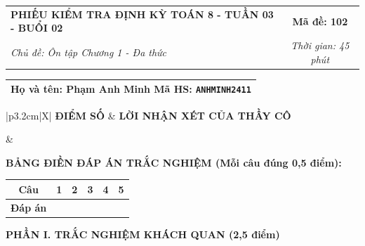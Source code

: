 \documentclass[12pt,a4paper]{article}
\begin{document}
\newpage


\noindent
\begin{tabularx}{\linewidth}{|X|c|}
\hline
\textbf{PHIẾU KIỂM TRA ĐỊNH KỲ TOÁN 8 - TUẦN 03 - BUỔI 02} & \textbf{Mã đề: 102} \\
\textit{Chủ đề: Ôn tập Chương 1 - Đa thức} & \textit{Thời gian: 45 phút} \\
\hline
\end{tabularx}

\vspace{1mm}

\noindent
\begin{tabularx}{\linewidth}{|X|}
\hline
\rule[-2mm]{0pt}{7.5mm}\textbf{Họ và tên:} \textbf{\large Phạm Anh Minh} \hfill \textbf{Mã HS:} \texttt{ANHMINH2411} \quad \\
\hline
\end{tabularx}

\vspace{1mm}

\noindent
\begin{tabularx}{\linewidth}{|p{3.2cm}|X|}
\hline
\centering\textbf{ĐIỂM SỐ} & \centering\textbf{LỜI NHẬN XÉT CỦA THẦY CÔ} \tabularnewline
\hline
\rule{0pt}{1.3cm} & \tabularnewline
\hline
\end{tabularx}

\vspace{1.2mm}

\noindent\textbf{BẢNG ĐIỀN ĐÁP ÁN TRẮC NGHIỆM (Mỗi câu đúng 0,5 điểm):}
\vspace{0.8mm}

\noindent
\renewcommand{\arraystretch}{1.35}
\begin{tabularx}{\linewidth}{|c|*{5}{>{\centering\arraybackslash}X|}}
\hline
\textbf{Câu} & \textbf{1} & \textbf{2} & \textbf{3} & \textbf{4} & \textbf{5} \\
\hline
\textbf{Đáp án} & & & & & \\
\hline
\end{tabularx}
\renewcommand{\arraystretch}{1.0}

\vspace{1.5mm}

\noindent\textbf{\large PHẦN I. TRẮC NGHIỆM KHÁCH QUAN (2,5 điểm)}
\vspace{1mm}
\end{document}
